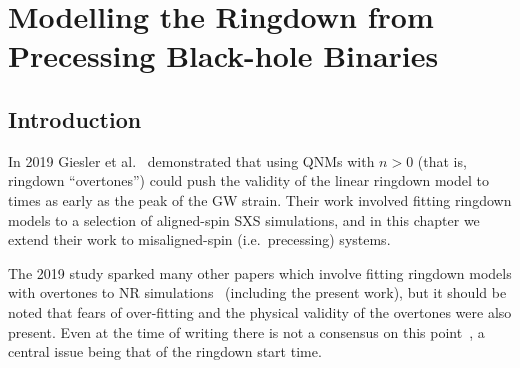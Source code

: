 
\chapter{Modelling the Ringdown from Precessing Black-hole Binaries}
\label{Chapter2}

\section{Introduction}
\label{ch2:sec:introduction}

In 2019 Giesler et al.~\cite{Giesler:2019uxc} demonstrated that using QNMs with $n > 0$ (that is, ringdown ``overtones'') could push the validity of the linear ringdown model to times as early as the peak of the GW strain. 
Their work involved fitting ringdown models to a selection of aligned-spin SXS simulations, and in this chapter we extend their work to misaligned-spin (i.e.\ precessing) systems.

The 2019 study sparked many other papers which involve fitting ringdown models with overtones to NR simulations~\cite{Bhagwat:2019dtm, Ota:2019bzl, JimenezForteza:2020cve, Cook:2020otn, Dhani:2020nik, Mourier:2020mwa, Dhani:2021vac, Forteza:2021wfq, MaganaZertuche:2021syq} (including the present work), but it should be noted that fears of over-fitting and the physical validity of the overtones were also present.
Even at the time of writing there is not a consensus on this point~\cite{Baibhav:2023clw, Nee:2023osy}, a central issue being that of the ringdown start time.

